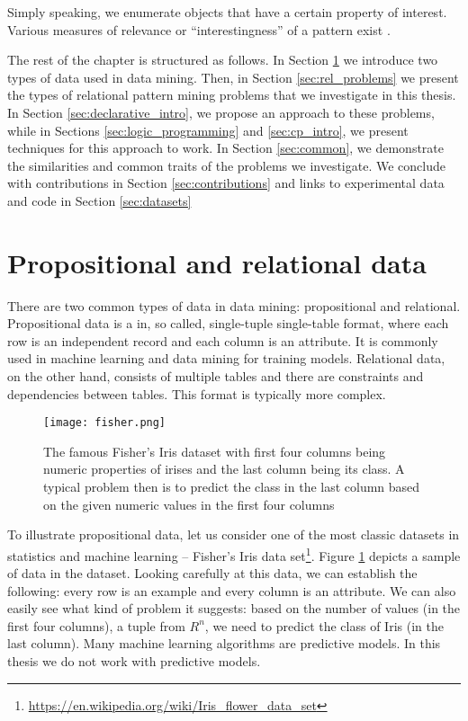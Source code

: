 Simply speaking, we enumerate objects that have a certain property of
interest. Various measures of relevance or ``interestingness'' of a pattern exist \parencite{tias_topk}.

The rest of the chapter is structured as follows. In Section
\ref{sec:data} we introduce two types of data used in data mining.
Then, in Section \ref{sec:rel_problems} we present the types of relational pattern
mining problems that we investigate in this thesis. In Section
\ref{sec:declarative_intro}, we propose an approach to these problems,
while in Sections \ref{sec:logic_programming} and \ref{sec:cp_intro},
we present techniques for this approach to work. In Section
\ref{sec:common}, we demonstrate the similarities and common traits of the
problems we investigate. We conclude with contributions in Section
\ref{sec:contributions} and links to experimental data and code in
Section \ref{sec:datasets}


\section{Propositional and relational data}\label{sec:data}
There are two common types of data in data mining: propositional and
relational. Propositional data is a in, so called, single-tuple
single-table format, where each row is an independent record and each
column is an attribute. It is commonly used in machine learning and data mining for training
models. Relational data, on the other hand, consists of  multiple
tables and there are constraints and dependencies between tables. This format is typically
more complex.

\pubrev
\begin{figure}[thb]
  \begin{center}
    \texttt{[image: fisher.png]}
  \end{center}
  \caption{The famous Fisher's Iris dataset with first four columns
    being numeric properties of irises and the last column being its
    class. A typical problem then is to predict the class in the last
    column based on the given numeric values in the first four columns}
  \label{fig:iris}
\end{figure}


To illustrate propositional data, let us consider one of the most
classic datasets in statistics and machine learning -- Fisher's Iris
data set\footnote{\url{https://en.wikipedia.org/wiki/Iris_flower_data_set}}.
Figure \ref{fig:iris} depicts a sample of data in the
dataset. Looking carefully at this data, we can establish the
following: every row is an example and every column is an attribute.
We can also easily see what kind of problem it suggests:
based on the number of values (in the first four columns), a tuple from $R^n$, we need to predict
the class of Iris (in the last column). Many machine learning algorithms
are predictive models. In this thesis we do not work with predictive models.

